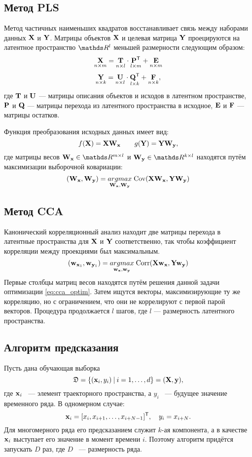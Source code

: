 \documentclass[a4paper, 12pt]{article}
\begin{document}
\subsection{Метод PLS}
Метод частичных наименьших квадратов восстанавливает связь между наборами данных $\mathbf{X}$ и $\mathbf{Y}$. 
Матрицы объектов $\mathbf{X}$ и целевая матрица $\mathbf{Y}$ проецируются на латентное пространство $\dR^l$ меньшей размерности следующим образом:
$$ \underset{n \times m}{\mathbf{X}} = \underset{n \times l}{\mathbf{T}} \cdot \underset{l \times m}{\mathbf{P}^{\mathsf{T}}} + \underset{n \times m}{\mathbf{E}} $$
$$ \underset{n \times k}{\mathbf{Y}} = \underset{n \times l}{\mathbf{U}} \cdot \underset{l \times k}{\mathbf{Q}^{\mathsf{T}}} + \underset{n \times k}{\mathbf{F}}, $$
где $\mathbf{T}$ и $\mathbf{U}$ --- матрицы описания объектов и исходов в латентном пространстве, $\mathbf{P}$ и $\mathbf{Q}$ --- матрицы перехода из латентного пространства в исходное, $\mathbf{E}$ и $\mathbf{F}$ --- матрицы остатков.

Функция преобразования исходных данных имеет вид: 
$$ f(\mathbf{X}) = \mathbf{X}\mathbf{W}_{\mathbf{x}} \qquad g(\mathbf{Y}) = \mathbf{Y}\mathbf{W}_{\mathbf{y}}, $$ 
где матрицы весов $\bW_{\bx} \in \dR^{m \times l}$ и $\bW_{\by} \in \dR^{k \times l}$ находятся путём максимизации выборочной ковариации:
$$ (\mathbf{W}_{\mathbf{x}}, \mathbf{W}_{\mathbf{y}}) = \underset{\mathbf{W}_{\mathbf{x}}, \mathbf{W}_{\mathbf{y}}}{argmax}\; \text{Cov}(\mathbf{X}\mathbf{W}_{\mathbf{x}}, \mathbf{Y}\mathbf{W}_{\mathbf{y}})$$

\subsection{Метод CCA}
Канонический корреляционный анализ находит две матрицы перехода в латентные пространства для $\mathbf{X}$ и $\mathbf{Y}$ соответственно, так чтобы коэффициент корреляции между проекциями был максимальным.
\begin{equation} \label{eq:cca_optim}
	(\mathbf{w}_{\mathbf{x}_1}, \mathbf{w}_{\mathbf{y}_1}) = \underset{\mathbf{w}_{\mathbf{x}}, \mathbf{w}_{\mathbf{y}}}{argmax}\; \text{Corr}(\mathbf{X}\mathbf{w}_{\mathbf{x}}, \mathbf{Y}\mathbf{w}_{\mathbf{y}})
\end{equation}
Первые столбцы матриц весов находятся путём решения данной задачи оптимизации \eqref{eq:cca_optim}. 
Затем ищутся векторы, максимизирующие ту же корреляцию, но с ограничением, что они не коррелируют с первой парой векторов.
Процедура продолжается $l$ шагов, где $l$ --- размерность латентного пространства.

\subsection{Алгоритм предсказания}
Пусть дана обучающая выборка $$\mathfrak{D} = \{ (\mathbf{x}_i, y_i) \: | \: i = 1, \ldots, d \} = (\mathbf{X}, \mathbf{y}),$$ где $\mathbf{x}_i$ ~--- элемент траекторного пространства, а $y_i$ ~--- будущее значение временного ряда.
В одномерном случае: $$\mathbf{x}_i = [x_i, x_{i+1}, \ldots, x_{i+N-1}]^{\mathsf{T}}, \quad y_i = x_{i+N}.$$
Для многомерного ряда его предсказанием служит $k\text{-ая}$ компонента, а в качестве $\mathbf{x}_i$ выступает его значение в момент времени $i$. Поэтому алгоритм придётся запускать $D$ раз, где $D$ ~--- размерность ряда.
\end{document}
